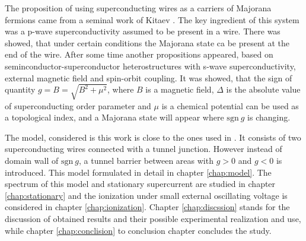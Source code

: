The proposition of using superconducting wires as a carriers of Majorana fermions came from a seminal work of Kitaev \cite{majorana_condmat_Kitaev}. The key ingredient of this system was a p-wave superconductivity assumed to be present in a wire. There was showed, that under certain conditions the Majorana state ca be present at the end of the wire. After some time another propositions\cite{Oreg_2010}\cite{Lutchyn_2010} appeared, based on seminconductor-superconductor heterostructures with s-wave superconductivity, external magnetic field and spin-orbit coupling. It was showed, that the sign of quantity $ g=B=\sqrt{B^2+\mu^2} $, where $ B $ is a magnetic field, $ \Delta $ is the absolute value of superconducting order parameter and $ \mu $ is a chemical potential can be used as a topological index, and a Majorana state will appear where $ \mathrm{sgn}~g $ is changing.

The model, considered is this work is close to the ones used in \cite{Oreg_2010}\cite{Lutchyn_2010}. It consists of two superconducting wires connected with a tunnel junction. However instead of domain wall of $ \mathrm{sgn}~g $, a tunnel barrier between areas with $ g>0 $ and $ g<0 $ is introduced. This model formulated in detail in chapter \ref{chap:model}. The spectrum of this model and stationary supercurrent are studied in chapter \ref{chap:stationary} and the ionization under small external oscillating voltage is considered in chapter \ref{chap:ionization}. Chapter \ref{chap:discssion}  stands for the discussion of obtained results and their possible experimental realization and use, while chapter \ref{chap:conclision} to conclusion chapter concludes the study.


